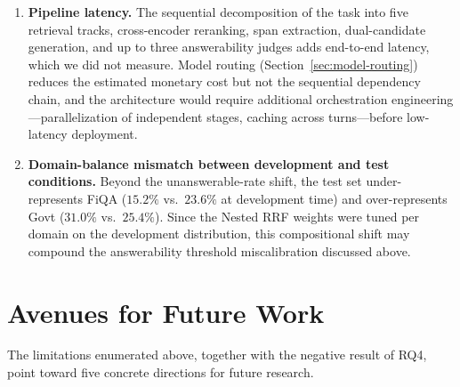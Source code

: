 \begin{enumerate}
    \item \textbf{Pipeline latency.} The sequential decomposition of the task into five retrieval tracks, cross-encoder reranking, span extraction, dual-candidate generation, and up to three answerability judges adds end-to-end latency, which we did not measure. Model routing (Section~\ref{sec:model-routing}) reduces the estimated monetary cost but not the sequential dependency chain, and the architecture would require additional orchestration engineering---parallelization of independent stages, caching across turns---before low-latency deployment.
    \item \textbf{Domain-balance mismatch between development and test conditions.} Beyond the unanswerable-rate shift, the test set under-represents FiQA ($15.2\%$ vs.\ $23.6\%$ at development time) and over-represents Govt ($31.0\%$ vs.\ $25.4\%$). Since the Nested RRF weights were tuned per domain on the development distribution, this compositional shift may compound the answerability threshold miscalibration discussed above.
\end{enumerate}

\section{Avenues for Future Work}
\label{sec:future-work}

The limitations enumerated above, together with the negative result of RQ4, point toward five concrete directions for future research.

